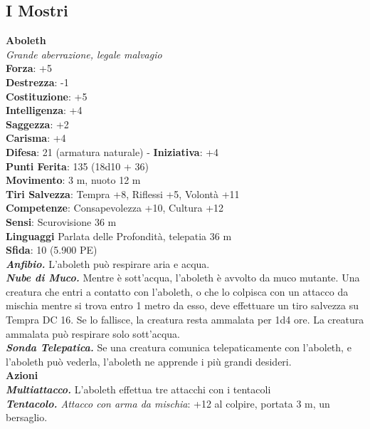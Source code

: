 \pagebreak
\subsection{I Mostri}

\bigskip

\begin{multicols}{2}

\textbf{Aboleth}\\
\emph{Grande aberrazione, legale malvagio}\\
\textbf{Forza}: +5\\
\textbf{Destrezza}: -1 \\
\textbf{Costituzione}: +5\\
\textbf{Intelligenza}: +4\\
\textbf{Saggezza}: +2\\
\textbf{Carisma}: +4\\
\textbf{Difesa}: 21 (armatura naturale) - \textbf{Iniziativa}: +4\\
\textbf{Punti Ferita}: 135 (18d10 + 36)\\
\textbf{Movimento}: 3 m, nuoto 12 m\\
\textbf{Tiri Salvezza}: Tempra +8, Riflessi +5, Volontà +11\\
\textbf{Competenze}: Consapevolezza +10, Cultura +12\\
\textbf{Sensi}: Scurovisione 36 m\\
\textbf{Linguaggi} Parlata delle Profondità, telepatia 36 m\\
\textbf{Sfida}: 10 (5.900 PE)\\
\smallskip
\emph{\textbf{Anfibio.}} L'aboleth può respirare aria e acqua.\\
\emph{\textbf{Nube di Muco.}} Mentre è sott'acqua, l'aboleth è avvolto da muco mutante. Una creatura che entri a contatto con l'aboleth, o che lo colpisca con un attacco da mischia mentre si trova entro 1 metro da esso, deve effettuare un tiro salvezza su Tempra DC  16. Se lo fallisce, la creatura resta ammalata per 1d4 ore. La creatura ammalata può respirare solo sott'acqua.\\
\emph{\textbf{Sonda Telepatica.}} Se una creatura comunica telepaticamente con l'aboleth, e l'aboleth può vederla, l'aboleth ne apprende i più grandi desideri. \\
\smallskip\textbf{Azioni}\\
\emph{\textbf{Multiattacco.}} L'aboleth effettua tre attacchi con i tentacoli\\
\emph{\textbf{Tentacolo.} Attacco con arma da mischia}: +12 al colpire, portata 3 m, un bersaglio.\\

\end{multicols}
